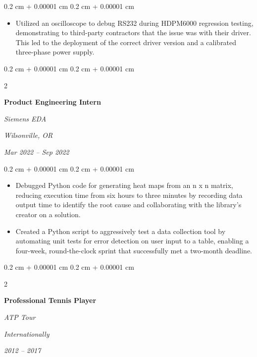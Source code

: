\documentclass[10pt, letterpaper]{article}
\newenvironment{highlights}{
    \begin{itemize}[
        topsep=0.10 cm,
        parsep=0.10 cm,
        partopsep=0pt,
        itemsep=0pt,
        leftmargin=0.4 cm + 10pt
    ]
}{
    \end{itemize}
} %
\newenvironment{onecolentry}{
    \begin{adjustwidth}{
        0.2 cm + 0.00001 cm
    }{
        0.2 cm + 0.00001 cm
    }
}{
    \end{adjustwidth}
} %
\newenvironment{twocolentry}[2][]{
    \onecolentry
    \def\secondColumn{#2}
    \setcolumnwidth{\fill, 4.5 cm}
    \begin{paracol}{2}
}{
    \switchcolumn \raggedleft \secondColumn
    \end{paracol}
    \endonecolentry
} %
\begin{document}
        \vspace{0.10 cm}
        \begin{onecolentry}
            \begin{highlights} 
                \item Utilized an oscilloscope to debug RS232 during HDPM6000 regression testing, demonstrating to third-party contractors that the issue was with their driver. This led to the deployment of the correct driver version and a calibrated three-phase power supply.
            \end{highlights}
        \end{onecolentry}

        \vspace{0.2 cm}

        \begin{twocolentry}{
        \textit{Wilsonville, OR}    
            
        \textit{Mar 2022 – Sep 2022}}
            \textbf{Product Engineering Intern}
            
            \textit{Siemens EDA}
        \end{twocolentry}

        \vspace{0.10 cm}
        \begin{onecolentry}
            \begin{highlights}
                \item Debugged Python code for generating heat maps from an n x n matrix, reducing execution time from six hours to three minutes by recording data output time to identify the root cause and collaborating with the library's creator on a solution.
                \item Created a Python script to aggressively test a data collection tool by automating unit tests for error detection on user input to a table, enabling a four-week, round-the-clock sprint that successfully met a two-month deadline.
            \end{highlights}
        \end{onecolentry}

        \vspace{0.2 cm}

        \begin{twocolentry}{
        \textit{Internationally}    
            
        \textit{2012 – 2017}}
            \textbf{Professional Tennis Player}
            
            \textit{ATP Tour}
        \end{twocolentry}
\end{document}
